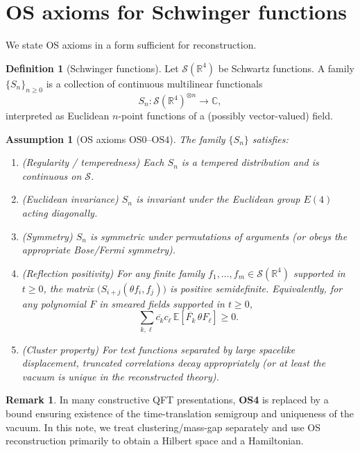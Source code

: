 \documentclass[11pt]{article}
\newtheorem{assumption}[theorem]{Assumption}
\theoremstyle{definition}
\newtheorem{definition}[theorem]{Definition}
\newtheorem{remark}[theorem]{Remark}
\newcommand{\E}{\mathbb{E}}
\newcommand{\1}{\mathbf{1}}
\newcommand{\R}{\mathbb{R}}
\newcommand{\cS}{\mathcal{S}}
\newcommand{\C}{\mathbb{C}}
\begin{document}
\section{OS axioms for Schwinger functions}

We state OS axioms in a form sufficient for reconstruction.

\begin{definition}[Schwinger functions]
Let \(\cS(\R^4)\) be Schwartz functions. A family \(\{S_n\}_{n\ge 0}\) is a collection of continuous multilinear functionals
\[
S_n: \cS(\R^4)^{\otimes n}\to \C,
\]
interpreted as Euclidean \(n\)-point functions of a (possibly vector-valued) field.
\end{definition}

\begin{assumption}[OS axioms \(\mathrm{OS}0\)--\(\mathrm{OS}4\)]\label{ass:OS}
The family \(\{S_n\}\) satisfies:
\begin{enumerate}[label=\textbf{OS\arabic*:},leftmargin=3.2em]
\item (\emph{Regularity / temperedness}) Each \(S_n\) is a tempered distribution and is continuous on \(\cS\).
\item (\emph{Euclidean invariance}) \(S_n\) is invariant under the Euclidean group \(E(4)\) acting diagonally.
\item (\emph{Symmetry}) \(S_n\) is symmetric under permutations of arguments (or obeys the appropriate Bose/Fermi symmetry).
\item (\emph{Reflection positivity}) For any finite family \(f_1,\dots,f_m\in \cS(\R^4)\) supported in \(t\ge 0\), the matrix
\(\big(S_{i+j}(\theta f_i, f_j)\big)\) is positive semidefinite. Equivalently, for any polynomial \(F\) in smeared fields supported in \(t\ge 0\),
\[
\sum_{k,\ell} \overline{c_k} c_\ell\, \E[\overline{F_k}\, \theta F_\ell] \ge 0.
\]
\item (\emph{Cluster property}) For test functions separated by large spacelike displacement, truncated correlations decay appropriately (or at least the vacuum is unique in the reconstructed theory).
\end{enumerate}
\end{assumption}

\begin{remark}
In many constructive QFT presentations, \textbf{OS4} is replaced by a bound ensuring existence of the time-translation semigroup and uniqueness of the vacuum. In this note, we treat clustering/mass-gap separately and use OS reconstruction primarily to obtain a Hilbert space and a Hamiltonian.
\end{remark}
\end{document}
